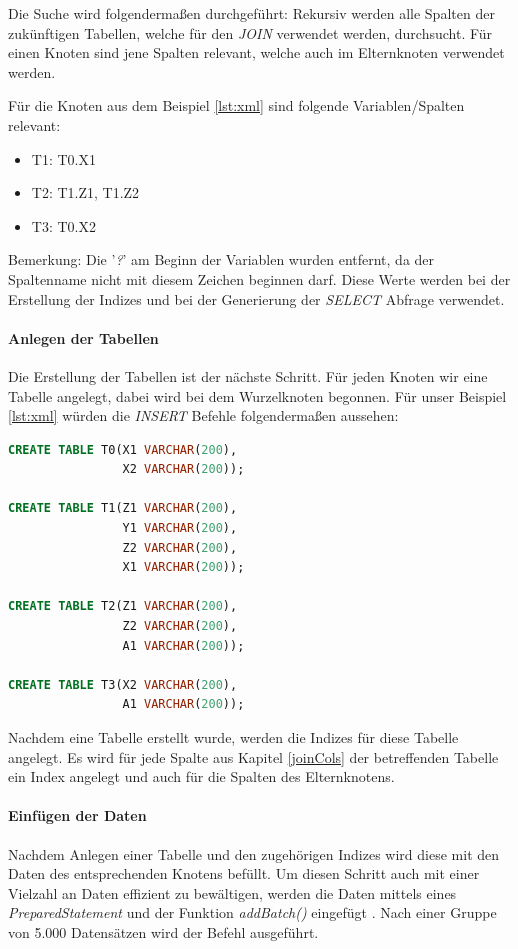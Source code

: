 \documentclass[draft,final]{vutinfth} %
\begin{document}
Die Suche wird folgenderma\ss en durchgeführt: Rekursiv werden alle Spalten der zukünftigen Tabellen, welche für den \textit{JOIN} verwendet werden, durchsucht. Für einen Knoten sind jene Spalten relevant, welche auch im Elternknoten verwendet werden. 

Für die Knoten aus dem Beispiel \ref{lst:xml} sind folgende Variablen/Spalten relevant:
\begin{itemize}
	\item T1: T0.X1
	\item T2: T1.Z1, T1.Z2
	\item T3: T0.X2
\end{itemize}
Bemerkung: Die '\textit{?}' am Beginn der Variablen wurden entfernt, da der Spaltenname nicht mit diesem Zeichen beginnen darf.
Diese Werte werden bei der Erstellung der Indizes und bei der Generierung der \textit{SELECT} Abfrage verwendet.

\paragraph{Anlegen der Tabellen}
Die Erstellung der Tabellen ist der nächste Schritt. Für jeden Knoten wir eine Tabelle angelegt, dabei wird bei dem Wurzelknoten begonnen. Für unser Beispiel \ref{lst:xml} würden die \textit{INSERT} Befehle folgenderma\ss en aussehen:

\begin{lstlisting}[language=SQL,caption={CREATE Befehle},frame = single]
CREATE TABLE T0(X1 VARCHAR(200), 
                X2 VARCHAR(200));

CREATE TABLE T1(Z1 VARCHAR(200), 
                Y1 VARCHAR(200), 
                Z2 VARCHAR(200), 
                X1 VARCHAR(200));

CREATE TABLE T2(Z1 VARCHAR(200), 
                Z2 VARCHAR(200), 
                A1 VARCHAR(200));

CREATE TABLE T3(X2 VARCHAR(200), 
                A1 VARCHAR(200));
\end{lstlisting}

Nachdem eine Tabelle erstellt wurde, werden die Indizes für diese Tabelle angelegt. Es wird für jede Spalte aus Kapitel \ref{joinCols} der betreffenden Tabelle ein Index angelegt und auch für die Spalten des Elternknotens.

\paragraph{Einfügen der Daten}
Nachdem Anlegen einer Tabelle und den zugehörigen Indizes wird diese mit den Daten des entsprechenden Knotens befüllt. Um diesen Schritt auch mit einer Vielzahl an Daten effizient zu bewältigen, werden die Daten mittels eines \textit{PreparedStatement} und der Funktion \textit{addBatch()} eingefügt \cite{AddBatch}. Nach einer Gruppe von 5.000 Datensätzen wird der Befehl ausgeführt.
\end{document}
